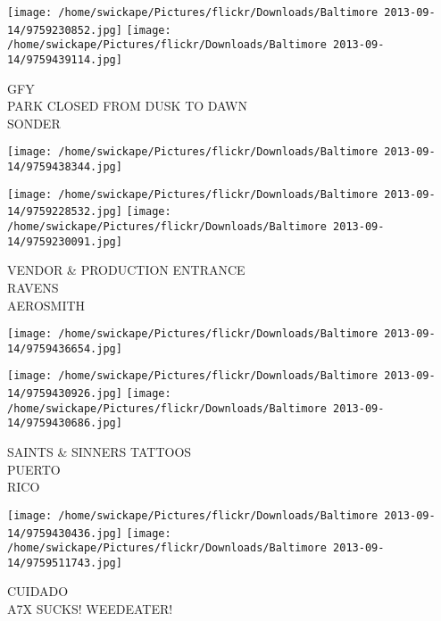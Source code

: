 \documentclass[10pt,letterpaper]{article}
\begin{document}
\vspace{0.25in}
\texttt{[image: /home/swickape/Pictures/flickr/Downloads/Baltimore 2013-09-14/9759230852.jpg]}
\texttt{[image: /home/swickape/Pictures/flickr/Downloads/Baltimore 2013-09-14/9759439114.jpg]}

GFY\\
PARK CLOSED FROM DUSK TO DAWN\\
SONDER\\
\pagebreak

\texttt{[image: /home/swickape/Pictures/flickr/Downloads/Baltimore 2013-09-14/9759438344.jpg]}

\vspace{0.25in}
\texttt{[image: /home/swickape/Pictures/flickr/Downloads/Baltimore 2013-09-14/9759228532.jpg]}
\texttt{[image: /home/swickape/Pictures/flickr/Downloads/Baltimore 2013-09-14/9759230091.jpg]}

VENDOR \& PRODUCTION ENTRANCE\\
RAVENS\\
AEROSMITH\\
\pagebreak

\texttt{[image: /home/swickape/Pictures/flickr/Downloads/Baltimore 2013-09-14/9759436654.jpg]}

\vspace{0.25in}
\texttt{[image: /home/swickape/Pictures/flickr/Downloads/Baltimore 2013-09-14/9759430926.jpg]}
\texttt{[image: /home/swickape/Pictures/flickr/Downloads/Baltimore 2013-09-14/9759430686.jpg]}

SAINTS \& SINNERS TATTOOS\\
PUERTO\\
RICO\\
\pagebreak

\texttt{[image: /home/swickape/Pictures/flickr/Downloads/Baltimore 2013-09-14/9759430436.jpg]}
\texttt{[image: /home/swickape/Pictures/flickr/Downloads/Baltimore 2013-09-14/9759511743.jpg]}

CUIDADO\\
A7X SUCKS!  WEEDEATER!\\
\pagebreak
\end{document}
